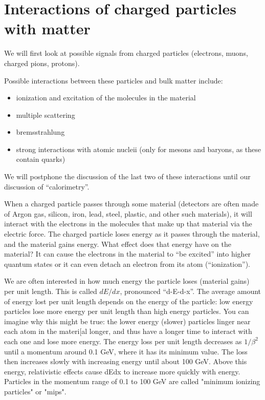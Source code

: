 \section{Interactions of charged particles with matter}
We will first look at possible signals from charged particles (electrons, muons, charged pions, protons).

Possible interactions between these particles and bulk matter include:
\begin{itemize}
\item ionization and excitation of the molecules in the material
\item multiple scattering
\item bremsstrahlung
\item strong interactions with atomic nucleii (only for mesons and baryons, as these contain quarks)
\end{itemize}
We will postphone the discussion of the last two of these interactions until our discussion of ``calorimetry''.

When a charged particle passes through some material (detectors are often made of Argon gas, silicon, iron, lead, steel, plastic, and other such materials), it will interact with the electrons in the molecules that make up that material via the electric force.  The charged particle loses energy as it passes through the material, and the material gains energy.  What effect does that energy have on the material?  It can cause the electrons in the material to ``be excited'' into higher quantum states or it can even detach an electron from its atom (``ionization'').  

We are often interested in how much energy the particle loses (material gains) per unit length.  This is called $dE/dx$, pronounced ``d-E-d-x''.    The average amount of energy lost per unit length depends on the energy of the particle: low energy particles lose more energy per unit length than high energy particles.  You can imagine why this might be true: the lower energy (slower) particles linger near each atom in the materi[al longer, and thus have a longer time to interact with each one and lose more energy.  The energy loss per unit length decreases as $1/\beta^2$ until a momentum around 0.1 GeV, where it has its minimum value.  The loss then increases slowly with increasing energy until about 100 GeV.  Above this energy, relativistic effects cause dEdx to increase more quickly with energy.  Particles in the momentum range of 0.1 to 100 GeV are called "minimum ionizing particles" or "mips".

